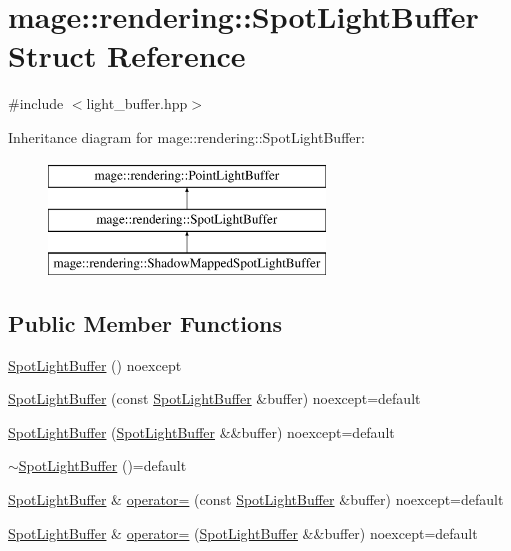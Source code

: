 \hypertarget{structmage_1_1rendering_1_1_spot_light_buffer}{}\section{mage\+:\+:rendering\+:\+:Spot\+Light\+Buffer Struct Reference}
\label{structmage_1_1rendering_1_1_spot_light_buffer}


{\ttfamily \#include $<$light\+\_\+buffer.\+hpp$>$}

Inheritance diagram for mage\+:\+:rendering\+:\+:Spot\+Light\+Buffer\+:\begin{figure}[H]
\begin{center}
\leavevmode
\includegraphics[height=3.000000cm]{structmage_1_1rendering_1_1_spot_light_buffer}
\end{center}
\end{figure}
\subsection*{Public Member Functions}
\begin{DoxyCompactItemize}
\item 
\mbox{\hyperlink{structmage_1_1rendering_1_1_spot_light_buffer_a603e2c40ae924a2183f24604297715aa}{Spot\+Light\+Buffer}} () noexcept
\item 
\mbox{\hyperlink{structmage_1_1rendering_1_1_spot_light_buffer_a091924b026f081f1612138806ff1e107}{Spot\+Light\+Buffer}} (const \mbox{\hyperlink{structmage_1_1rendering_1_1_spot_light_buffer}{Spot\+Light\+Buffer}} \&buffer) noexcept=default
\item 
\mbox{\hyperlink{structmage_1_1rendering_1_1_spot_light_buffer_a36fe774118a2b1d0e48ba89e74d09886}{Spot\+Light\+Buffer}} (\mbox{\hyperlink{structmage_1_1rendering_1_1_spot_light_buffer}{Spot\+Light\+Buffer}} \&\&buffer) noexcept=default
\item 
\mbox{\hyperlink{structmage_1_1rendering_1_1_spot_light_buffer_ab1fecb64be60d395b0bc5d3e6cc4072a}{$\sim$\+Spot\+Light\+Buffer}} ()=default
\item 
\mbox{\hyperlink{structmage_1_1rendering_1_1_spot_light_buffer}{Spot\+Light\+Buffer}} \& \mbox{\hyperlink{structmage_1_1rendering_1_1_spot_light_buffer_a6bfd4e7dc9b8a7d3cd5206c9becb91cf}{operator=}} (const \mbox{\hyperlink{structmage_1_1rendering_1_1_spot_light_buffer}{Spot\+Light\+Buffer}} \&buffer) noexcept=default
\item 
\mbox{\hyperlink{structmage_1_1rendering_1_1_spot_light_buffer}{Spot\+Light\+Buffer}} \& \mbox{\hyperlink{structmage_1_1rendering_1_1_spot_light_buffer_ab3d50a0d08d284577b0e43b05c34e287}{operator=}} (\mbox{\hyperlink{structmage_1_1rendering_1_1_spot_light_buffer}{Spot\+Light\+Buffer}} \&\&buffer) noexcept=default
\end{DoxyCompactItemize}
